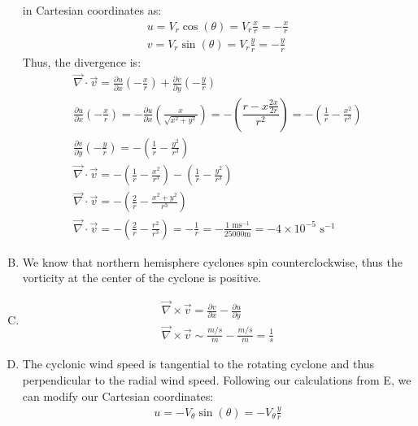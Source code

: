 \documentclass[11pt,a4paper,margin=1in]{article}
\begin{document}
\begin{enumerate}[A.]
    in Cartesian coordinates as:
    \begin{gather*}
        u = V_r \cos(\theta) = V_r \frac{x}{r} = -\frac{x}{r} \\
        v = V_r \sin(\theta) = V_r \frac{y}{r} = -\frac{y}{r}
    \end{gather*}
    Thus, the divergence is:
    \begin{gather*}
        \vec{\nabla} \cdot \vec{v} = \frac{\partial u}{\partial x}\left(-\frac{x}{r}\right) 
            + \frac{\partial v}{\partial y}\left(-\frac{y}{r}\right) \\
        \frac{\partial u}{\partial x}\left(-\frac{x}{r}\right) = -\frac{\partial u}
            {\partial x}\left(\frac{x}{\sqrt{x^2 + y^2}}\right) = -\left(\dfrac{
                r - x \frac{2x}{2r}}{r^2}\right) = -\left(\frac{1}{r} - 
                \frac{x^2}{r^3}\right)\\
        \frac{\partial v}{\partial y}\left(-\frac{y}{r}\right) = -\left(\frac{1}{r}
            - \frac{y^2}{r^3}\right) \\
        \vec{\nabla} \cdot \vec{v} = -\left(\frac{1}{r} - \frac{x^2}{r^3}\right)
            - \left(\frac{1}{r} - \frac{y^2}{r^3}\right) \\
        \vec{\nabla} \cdot \vec{v} = -\left(\frac{2}{r} - \frac{x^2 + y^2}{r^3}\right) \\
        \vec{\nabla} \cdot \vec{v} = -\left(\frac{2}{r} - \frac{r^2}{r^3}\right) 
            = -\frac{1}{r} = -\frac{1 \text{ ms}^{-1}}{25000 \text{m}} = -4 
            \times 10^{-5} \text{ s}^{-1}
    \end{gather*}
    \item 
    We know that northern hemisphere cyclones spin counterclockwise, thus the
    vorticity at the center of the cyclone is positive.
    \item 
    \begin{gather*}
        \vec{\nabla} \times \vec{v} = \frac{\partial v}{\partial x} - 
            \frac{\partial u}{\partial y} \\
        \vec{\nabla} \times \vec{v} \sim \frac{m/s}{m} - \frac{m/s}{m} = \frac{1}{s}
    \end{gather*}
    \item 
    The cyclonic wind speed is tangential to the rotating cyclone and thus 
    perpendicular to the radial wind speed. Following our calculations from E, 
    we can modify our Cartesian coordinates:
    \begin{gather*}
        u = -V_\theta \sin(\theta) = -V_\theta \frac{y}{r} \\

\end{gather*}
\end{enumerate}
\end{document}
